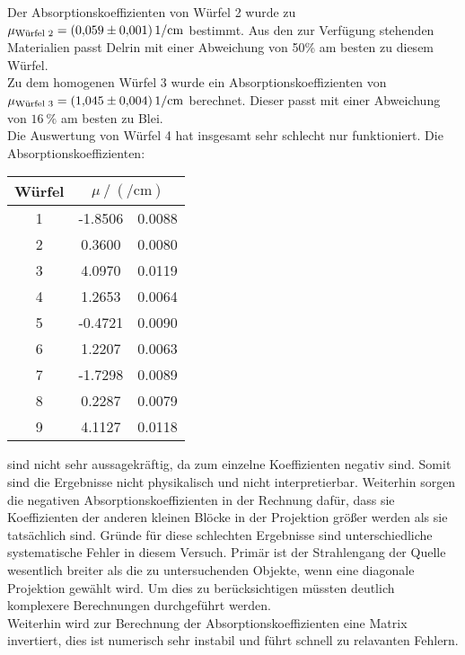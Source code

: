 \noindent Der Absorptionskoeffizienten von Würfel 2 wurde zu $\mu_\t{Würfel 2} = \SI{0.059(0001)}{1\per\centi\metre}$ bestimmt.
Aus den zur Verfügung stehenden Materialien passt Delrin mit einer Abweichung von 50\% am besten zu diesem Würfel.\\
\noindent
Zu dem homogenen Würfel 3 wurde ein Absorptionskoeffizienten von $\mu_\t{Würfel 3} = \SI{1.045(0004)}{1\per\centi\metre}$ berechnet.
Dieser passt mit einer Abweichung von $\SI{16}{\percent}$ am besten zu Blei.\\
\noindent
Die Auswertung von Würfel 4 hat insgesamt sehr schlecht nur funktioniert. Die Absorptionskoeffizienten:
  \begin{table}[H]
    \centering
    \begin{tabular}{c S[table-format=3.4] @{${}\pm{}$} S[table-format=1.4] }
      \toprule
      {Würfel} &   \\
       & -1.8506& 0.0088 \\
      2 & 0.3600 & 0.0080 \\
      3 & 4.0970 & 0.0119 \\
      4 & 1.2653 & 0.0064 \\
      5 & -0.4721& 0.0090 \\
      6 & 1.2207 & 0.0063 \\
      7 & -1.7298& 0.0089 \\
      8 & 0.2287 & 0.0079 \\
      9 & 4.1127 & 0.0118 \\
      \bottomrule
    \end{tabular}
  \end{table} 
\noindent
sind nicht sehr aussagekräftig, da zum einzelne Koeffizienten negativ sind. Somit sind die Ergebnisse nicht physikalisch und nicht interpretierbar.
Weiterhin sorgen die negativen Absorptionskoeffizienten in der Rechnung dafür, dass sie Koeffizienten der anderen kleinen Blöcke in der Projektion größer werden als sie tatsächlich sind.
Gründe für diese schlechten Ergebnisse sind unterschiedliche systematische Fehler in diesem Versuch.
Primär ist der Strahlengang der Quelle wesentlich breiter als die zu untersuchenden Objekte, wenn eine diagonale Projektion gewählt wird. 
Um dies zu berücksichtigen müssten deutlich komplexere Berechnungen durchgeführt werden.\\
Weiterhin wird zur Berechnung der Absorptionskoeffizienten eine Matrix invertiert, dies ist numerisch sehr instabil und führt schnell zu relavanten Fehlern.
